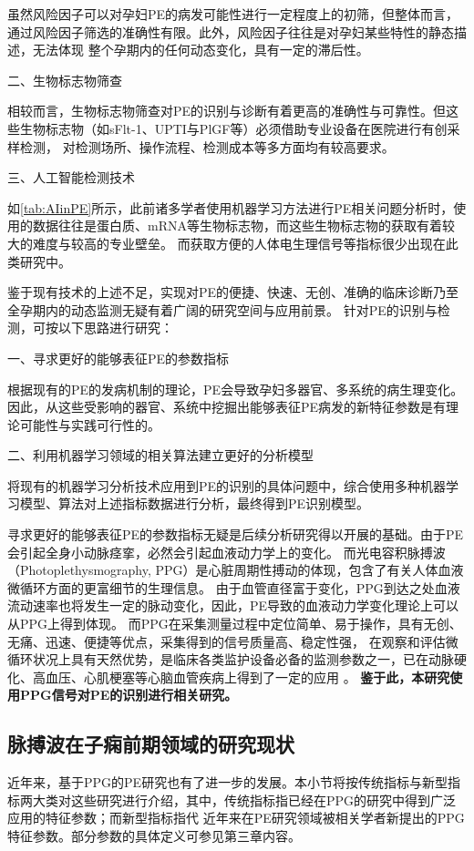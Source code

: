 虽然风险因子可以对孕妇PE的病发可能性进行一定程度上的初筛，但整体而言，通过风险因子筛选的准确性有限。此外，风险因子往往是对孕妇某些特性的静态描述，无法体现
整个孕期内的任何动态变化，具有一定的滞后性。

二、生物标志物筛查

相较而言，生物标志物筛查对PE的识别与诊断有着更高的准确性与可靠性。但这些生物标志物（如sFlt-1、UPTI与PlGF等）必须借助专业设备在医院进行有创采样检测，
对检测场所、操作流程、检测成本等多方面均有较高要求。

三、人工智能检测技术

如\autoref{tab:AIinPE}所示，此前诸多学者使用机器学习方法进行PE相关问题分析时，使用的数据往往是蛋白质、mRNA等生物标志物，而这些生物标志物的获取有着较大的难度与较高的专业壁垒。
而获取方便的人体电生理信号等指标很少出现在此类研究中。

鉴于现有技术的上述不足，实现对PE的便捷、快速、无创、准确的临床诊断乃至全孕期内的动态监测无疑有着广阔的研究空间与应用前景。
针对PE的识别与检测，可按以下思路进行研究：

一、寻求更好的能够表征PE的参数指标

根据现有的PE的发病机制的理论，PE会导致孕妇多器官、多系统的病生理变化。因此，从这些受影响的器官、系统中挖掘出能够表征PE病发的新特征参数是有理论可能性与实践可行性的。

二、利用机器学习领域的相关算法建立更好的分析模型

将现有的机器学习分析技术应用到PE的识别的具体问题中，综合使用多种机器学习模型、算法对上述指标数据进行分析，最终得到PE识别模型。

寻求更好的能够表征PE的参数指标无疑是后续分析研究得以开展的基础。由于PE会引起全身小动脉痉挛，必然会引起血液动力学上的变化。
而光电容积脉搏波（Photoplethysmography, PPG）是心脏周期性搏动的体现，包含了有关人体血液微循环方面的更富细节的生理信息\cite{PPGYY}。
由于血管直径富于变化，PPG到达之处血液流动速率也将发生一定的脉动变化，因此，PE导致的血液动力学变化理论上可以从PPG上得到体现。
而PPG在采集测量过程中定位简单、易于操作，具有无创、无痛、迅速、便捷等优点，采集得到的信号质量高、稳定性强，
在观察和评估微循环状况上具有天然优势，是临床各类监护设备必备的监测参数之一，已在动脉硬化、高血压、心肌梗塞等心脑血管疾病上得到了一定的应用
\cite{PPGYY,Allen2007,THOCBPM,Zhang2010,ldl,lhc}。
\textbf{鉴于此，本研究使用PPG信号对PE的识别进行相关研究。}

\subsection{脉搏波在子痫前期领域的研究现状}
近年来，基于PPG的PE研究也有了进一步的发展。本小节将按传统指标与新型指标两大类对这些研究进行介绍，其中，传统指标指已经在PPG的研究中得到广泛应用的特征参数；而新型指标指代
近年来在PE研究领域被相关学者新提出的PPG特征参数。部分参数的具体定义可参见第三章内容。

